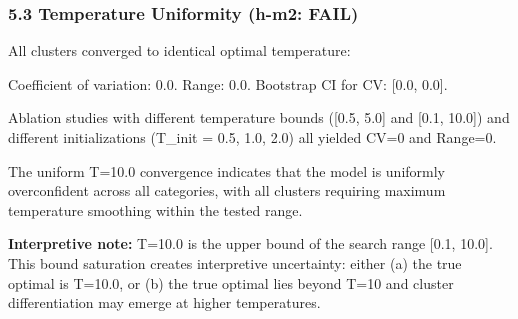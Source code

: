\subsubsection{5.3 Temperature Uniformity (h-m2: FAIL)}

All clusters converged to identical optimal temperature:

\begin{table}[htbp]
\centering
{}
\end{table}

Coefficient of variation: 0.0. Range: 0.0. Bootstrap CI for CV: [0.0, 0.0].

Ablation studies with different temperature bounds ([0.5, 5.0] and [0.1, 10.0]) and different initializations (T\_init = 0.5, 1.0, 2.0) all yielded CV=0 and Range=0.

The uniform T=10.0 convergence indicates that the model is uniformly overconfident across all categories, with all clusters requiring maximum temperature smoothing within the tested range.

\textbf{Interpretive note:} T=10.0 is the upper bound of the search range [0.1, 10.0]. This bound saturation creates interpretive uncertainty: either (a) the true optimal is T=10.0, or (b) the true optimal lies beyond T=10 and cluster differentiation may emerge at higher temperatures.
